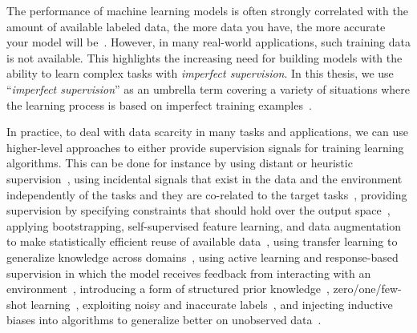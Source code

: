 
The performance of machine learning models is often strongly correlated with the amount of available labeled data,
the more data you have, the more accurate your model will be~\citep{halevy2009unreasonable,sun2017revisiting}.  
However, in many real-world applications, such training data is not available.
This highlights the increasing need for building models with the ability to learn complex tasks with \emph{imperfect supervision}. 
In this thesis, we use ``\emph{imperfect supervision}'' as an umbrella term covering a variety of situations where the learning process is based on imperfect training examples~\citep{zhou2018brief}.

In practice, to deal with data scarcity in many tasks and applications, we can use higher-level approaches to either provide supervision signals for training learning algorithms. 
This can be done for instance by
using distant or heuristic supervision~\citep{Deriu2016:SemEval,Severyn:2015:SemEval, Dehghani:2016:SIGIR, dehghani:2018:ICLR, Dehghani:2017:nips_metalearn, Ratner:2016,Rekatsinas:2017,Varma:2017}, 
%
using incidental signals that exist in the data and the environment independently of the tasks and they are co-related to the target tasks~\citep{roth2017incidental}, 
%
providing supervision by specifying constraints that should hold over the output space~\citep{stewart2017label, clarke2010driving}, 
%
applying bootstrapping, self-supervised feature learning, and data augmentation to make statistically efficient reuse of available data~\citep{cubuk2018autoaugment, dosovitskiy2016discriminative,donahue2016adversarial},
%
using transfer learning to generalize knowledge across domains~\citep{Ruder:2019},
%
using active learning and response-based supervision in which the model receives feedback from interacting with an environment~\citep{clarke2010driving,riezler2014response},
%
introducing a form of structured prior knowledge~\citep{Dehghani:CIKM2016:long,Dehghani:2016:ICTIR}, 
%
zero/one/few-shot learning~\citep{vinyals2016matching,finn2017model,snell2017prototypical,socher2013zero},
%
exploiting noisy and inaccurate labels~\citep{Vahdat:2017, Lee:2013,Hinton:2015,Brodley:1999,reed2014training, Patrini:2016, patrini2016loss,malach2017decoupling}, 
%
and injecting inductive biases into algorithms to generalize better on unobserved data~\citep{cohen2016group, cohen2016steerable, Dehghani:ICLR:2019}.

